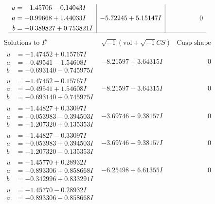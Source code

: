 \documentclass[1p]{elsarticle_modified}
\theoremstyle{definition}
\newcommand{\I}{\sqrt{-1}}
\begin{document}
$$\begin{array}{c|c|c}
\begin{aligned}
u &= \phantom{-}1.45706 - 0.14043 I \\
a &= -0.99668 + 1.44033 I \\
b &= -0.389827 + 0.753821 I\end{aligned}
 & -5.72245 + 5.15147 I & \phantom{-0.000000 } 0\\
 \hline 
 \end{array}$$\newpage$$\begin{array}{c|c|c}  
\text{Solutions to }I^u_{1}& \I (\text{vol} + \sqrt{-1}CS) & \text{Cusp shape}\\
 \hline 
\begin{aligned}
u &= -1.47452 + 0.15767 I \\
a &= -0.49541 - 1.54608 I \\
b &= -0.693140 - 0.745975 I\end{aligned}
 & -8.21597 + 3.64315 I & \phantom{-0.000000 } 0 \\ \hline\begin{aligned}
u &= -1.47452 - 0.15767 I \\
a &= -0.49541 + 1.54608 I \\
b &= -0.693140 + 0.745975 I\end{aligned}
 & -8.21597 - 3.64315 I & \phantom{-0.000000 } 0 \\ \hline\begin{aligned}
u &= -1.44827 + 0.33097 I \\
a &= -0.053983 - 0.394503 I \\
b &= -1.207320 + 0.135353 I\end{aligned}
 & -3.69746 + 9.38157 I & \phantom{-0.000000 } 0 \\ \hline\begin{aligned}
u &= -1.44827 - 0.33097 I \\
a &= -0.053983 + 0.394503 I \\
b &= -1.207320 - 0.135353 I\end{aligned}
 & -3.69746 - 9.38157 I & \phantom{-0.000000 } 0 \\ \hline\begin{aligned}
u &= -1.45770 + 0.28932 I \\
a &= -0.893306 + 0.858668 I \\
b &= -0.342996 + 0.833291 I\end{aligned}
 & -6.25498 + 6.61355 I & \phantom{-0.000000 } 0 \\ \hline\begin{aligned}
u &= -1.45770 - 0.28932 I \\
a &= -0.893306 - 0.858668 I \\

\end{aligned}
\end{array}$$
\end{document}
